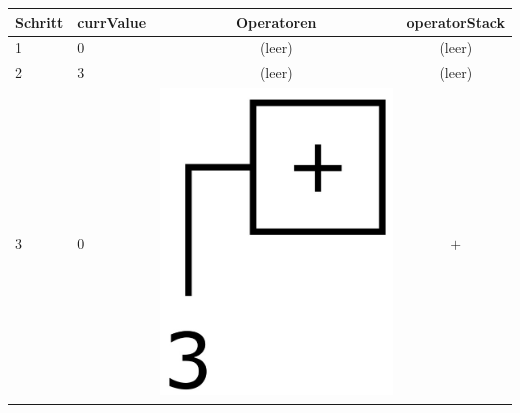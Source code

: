 \documentclass[12pt, a4paper]{report}
\begin{document}
\begin{center}
\begin{tabular}{ |l|l|c|c| } 
	\hline
	\textbf{Schritt} & \textbf{currValue} & \textbf{Operatoren} & \textbf{operatorStack} \\ 
	\hline
	1 & 0 & (leer) & (leer) \\
	\hline
	2 & 3 & (leer) & (leer) \\ 
	\hline
	3 & 0 & \includegraphics[trim=0 -2 0 -2,height=0.06\textheight]{assets/expr0.jpg} & $+$ \\ 
	\hline

\end{tabular}
\end{center}
\end{document}
